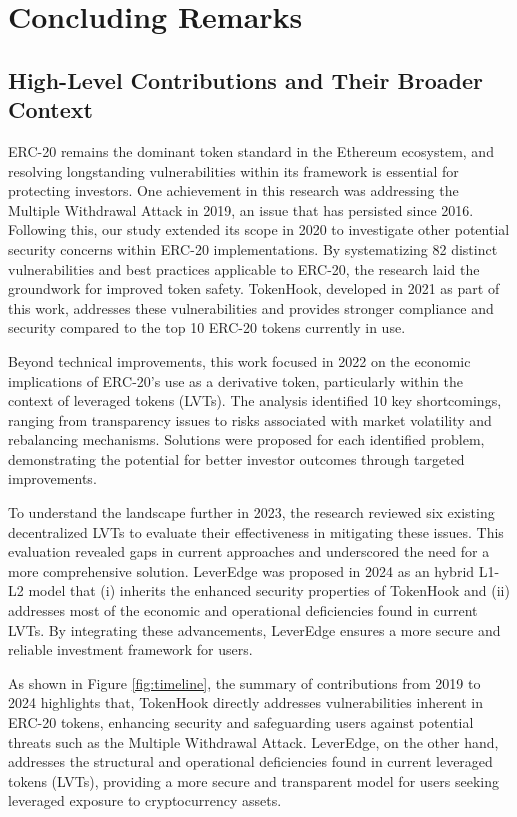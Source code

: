 
\chapter{Concluding Remarks}\label{ch:remarks}
\section{High-Level Contributions and Their Broader Context}
ERC-20 remains the dominant token standard in the Ethereum ecosystem, and resolving longstanding vulnerabilities within its framework is essential for protecting investors. One achievement in this research was addressing the Multiple Withdrawal Attack in 2019, an issue that has persisted since 2016. Following this, our study extended its scope in 2020 to investigate other potential security concerns within ERC-20 implementations. By systematizing 82 distinct vulnerabilities and best practices applicable to ERC-20, the research laid the groundwork for improved token safety. TokenHook, developed in 2021 as part of this work, addresses these vulnerabilities and provides stronger compliance and security compared to the top 10 ERC-20 tokens currently in use.

Beyond technical improvements, this work focused in 2022 on the economic implications of ERC-20's use as a derivative token, particularly within the context of leveraged tokens (LVTs). The analysis identified 10 key shortcomings, ranging from transparency issues to risks associated with market volatility and rebalancing mechanisms. Solutions were proposed for each identified problem, demonstrating the potential for better investor outcomes through targeted improvements.

To understand the landscape further in 2023, the research reviewed six existing decentralized LVTs to evaluate their effectiveness in mitigating these issues. This evaluation revealed gaps in current approaches and underscored the need for a more comprehensive solution. LeverEdge was proposed in 2024 as an hybrid L1-L2 model that (i) inherits the enhanced security properties of TokenHook and (ii) addresses most of the economic and operational deficiencies found in current LVTs. By integrating these advancements, LeverEdge ensures a more secure and reliable investment framework for users.

As shown in Figure \ref{fig:timeline}, the summary of contributions from 2019 to 2024 highlights that, TokenHook directly addresses vulnerabilities inherent in ERC-20 tokens, enhancing security and safeguarding users against potential threats such as the Multiple Withdrawal Attack. LeverEdge, on the other hand, addresses the structural and operational deficiencies found in current leveraged tokens (LVTs), providing a more secure and transparent model for users seeking leveraged exposure to cryptocurrency assets.

